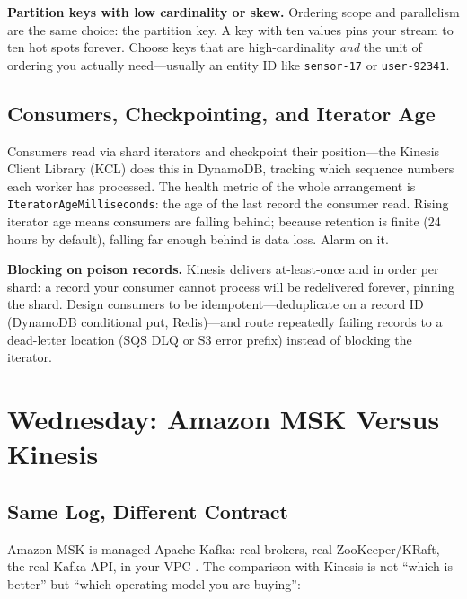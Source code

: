 \begin{pitfall}
\textbf{Partition keys with low cardinality or skew.} Ordering scope and parallelism are the same choice: the partition key. A key with ten values pins your stream to ten hot spots forever. Choose keys that are high-cardinality \emph{and} the unit of ordering you actually need---usually an entity ID like \texttt{sensor-17} or \texttt{user-92341}.
\end{pitfall}

\subsection{Consumers, Checkpointing, and Iterator Age}
Consumers read via shard iterators and checkpoint their position---the Kinesis Client Library (KCL) does this in DynamoDB, tracking which sequence numbers each worker has processed. The health metric of the whole arrangement is \texttt{IteratorAgeMilliseconds}: the age of the last record the consumer read. Rising iterator age means consumers are falling behind; because retention is finite (24 hours by default), falling far enough behind is data loss. Alarm on it.

\begin{pitfall}
\textbf{Blocking on poison records.} Kinesis delivers at-least-once and in order per shard: a record your consumer cannot process will be redelivered forever, pinning the shard. Design consumers to be idempotent---deduplicate on a record ID (DynamoDB conditional put, Redis)---and route repeatedly failing records to a dead-letter location (SQS DLQ or S3 error prefix) instead of blocking the iterator.
\end{pitfall}

\section{Wednesday: Amazon MSK Versus Kinesis}
\subsection{Same Log, Different Contract}
Amazon MSK is managed Apache Kafka: real brokers, real ZooKeeper/KRaft, the real Kafka API, in your VPC \cite{awsMSKDocs,apacheKafkaProject}. The comparison with Kinesis is not ``which is better'' but ``which operating model you are buying'':

